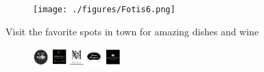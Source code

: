 \begin{figure}
  \begin{center}
    \leavevmode
    \texttt{[image: ./figures/Fotis6.png]}
  \end{center}
\end{figure}
Visit the favorite spots in town for amazing dishes and wine
\begin{figure}
  \begin{center}
    \leavevmode
    \includegraphics[width=0.3\textwidth]{./figures/restaurants.png}
  \end{center}
\end{figure}
